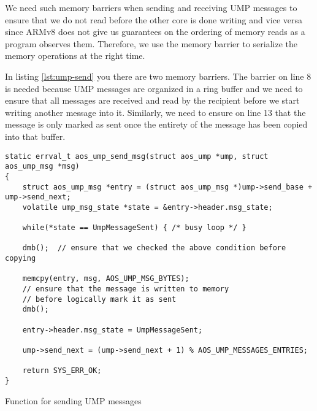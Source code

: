 We need such memory barriers when sending and receiving UMP messages to ensure
that we do not read before the other core is done writing and vice versa since ARMv8
does not give us guarantees on the ordering of memory reads as a program observes them.
Therefore, we use the memory barrier to serialize the memory operations at the right time.

In listing \ref{lst:ump-send} you there are two memory barriers. The barrier on
line 8 is needed because UMP messages are organized in a ring buffer and we need
to ensure that all messages are received and read by the recipient before we
start writing another message into it. Similarly, we need to ensure on line 13
that the message is only marked as sent once the entirety of the message has been
copied into that buffer.

\begin{listing}[h]
\begin{verbatim}
static errval_t aos_ump_send_msg(struct aos_ump *ump, struct aos_ump_msg *msg)
{
    struct aos_ump_msg *entry = (struct aos_ump_msg *)ump->send_base + ump->send_next;
    volatile ump_msg_state *state = &entry->header.msg_state;

    while(*state == UmpMessageSent) { /* busy loop */ }

    dmb();  // ensure that we checked the above condition before copying

    memcpy(entry, msg, AOS_UMP_MSG_BYTES);
    // ensure that the message is written to memory 
    // before logically mark it as sent
    dmb();  

    entry->header.msg_state = UmpMessageSent;

    ump->send_next = (ump->send_next + 1) % AOS_UMP_MESSAGES_ENTRIES;

    return SYS_ERR_OK;
}
\end{verbatim}
\caption{Function for sending UMP messages}
\label{lst:ump-send}
\end{listing}

